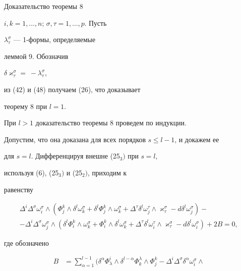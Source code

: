\begin{pf*}{Доказательство теоремы 8}
\begin{equation}
\end{equation}


$i,k=1,\dotsc,n$; $\sigma,\tau=1,\dotsc,p$. Пусть


$\lambda^{\sigma}_{\tau}$ --- 1-формы, определяемые


леммой 9. Обозначив


$\delta\varkappa^{\sigma}_{\tau}=~-\lambda^{\sigma}_{\tau}$,


из (42) и (48) получаем (26), что доказывает


теорему 8 при $l=1$.





При $l>1$ доказательство теоремы 8 проведем по индукции.


Допустим, что она доказана для всех порядков $s\le l-1$, и докажем ее


для $s=l$. Дифференцируя внешне (25${}_3)$ при $s=l$,


используя (6), (25${}_3)$ и (25${}_2)$, приходим к


равенству


\begin{multline}


\Delta^i\Delta^{\sigma}\omega^{\sigma}_i\wedge(\Phi^k_j\wedge\delta^l


\omega^{\sigma}_k+\delta^l\Phi^k_j\wedge\omega^{\sigma}_k+


\Delta^{\tau}\delta^l\omega^{\tau}_j\wedge\varkappa^{\sigma}_{\tau}-


d\delta^l\omega^{\sigma}_j)-\\


%


-\Delta^i\Delta^{\sigma}\omega^{\sigma}_j\wedge(\delta^l\Phi^k_i


\wedge\omega^{\sigma}_k+\Phi^k_i\wedge\delta^l\omega^{\sigma}_k+


\Delta^{\tau}\delta^l\omega^{\tau}_i\wedge\varkappa^{\sigma}_{\tau}-


d\delta^l\omega^{\sigma}_i)+2B=0,


\end{multline}


где обозначено


\begin{align*}


B&=\sum_{\alpha=1}^{l-1}(\delta^{\alpha}\Phi^i_{\lambda}


\wedge\delta^{l-\alpha}\Phi^{\lambda}_k\wedge\Phi^k_j-


\Delta^i\Delta^{\sigma}\delta^{\alpha}\omega^{\sigma}_i\wedge



\end{align*}
\end{pf*}
